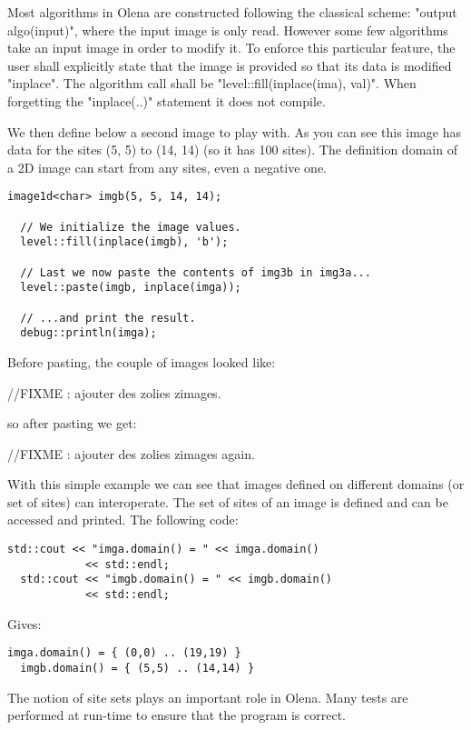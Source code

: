 \documentclass{report}
\begin{document}
Most algorithms in Olena are constructed following the classical scheme: "output
algo(input)", where the input image is only read. However some few algorithms
take an input image in order to modify it.  To enforce this particular feature,
the user shall explicitly state that the image is provided so that its data is
modified "inplace". The algorithm call shall be "level::fill(inplace(ima),
val)". When forgetting the "inplace(..)" statement it does not compile.

We then define below a second image to play with.  As you can see this image has
data for the sites (5, 5) to (14, 14) (so it has 100 sites).  The definition
domain of a 2D image can start from any sites, even a negative one.

\begin{lstlisting}[frame=single]
  image1d<char> imgb(5, 5, 14, 14);

  // We initialize the image values.
  level::fill(inplace(imgb), 'b');

  // Last we now paste the contents of img3b in img3a...
  level::paste(imgb, inplace(imga));

  // ...and print the result.
  debug::println(imga);
\end{lstlisting}

Before pasting, the couple of images looked like:

//FIXME : ajouter des zolies zimages.

so after pasting we get:

//FIXME : ajouter des zolies zimages again.

With this simple example we can see that images defined on different domains (or
set of sites) can interoperate.  The set of sites of an image is defined and
can be accessed and printed. The following code:

\begin{lstlisting}[frame=single]
  std::cout << "imga.domain() = " << imga.domain()
            << std::endl;
  std::cout << "imgb.domain() = " << imgb.domain()
            << std::endl;
\end{lstlisting}

Gives:
\begin{lstlisting}[frame=single]
  imga.domain() = { (0,0) .. (19,19) }
  imgb.domain() = { (5,5) .. (14,14) }
\end{lstlisting}

The notion of site sets plays an important role in Olena. Many tests are
performed at run-time to ensure that the program is correct.
\end{document}
